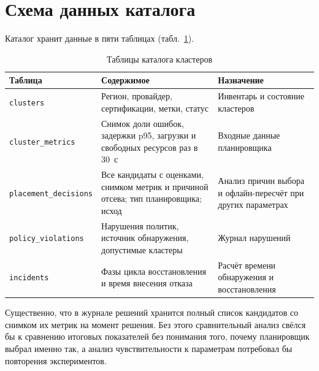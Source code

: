 \section{Схема данных каталога}

Каталог хранит данные в пяти таблицах (табл.~\ref{tab:schema}).

\begin{table}[H]
  \centering
  \caption{Таблицы каталога кластеров}
  \label{tab:schema}
  \small
  \begin{tabularx}{\textwidth}{@{}lXX@{}}
    \toprule
    Таблица & Содержимое & Назначение \\
    \midrule
    \texttt{clusters} & Регион, провайдер, сертификации, метки, статус &
      Инвентарь и состояние кластеров \\
    \texttt{cluster\_metrics} & Снимок доли ошибок, задержки p95, загрузки и
      свободных ресурсов раз в 30~с & Входные данные планировщика \\
    \texttt{placement\_decisions} & Все кандидаты с оценками, снимком метрик
      и причиной отсева; тип планировщика; исход & Анализ причин выбора и
      офлайн-пересчёт при других параметрах \\
    \texttt{policy\_violations} & Нарушения политик, источник обнаружения,
      допустимые кластеры & Журнал нарушений \\
    \texttt{incidents} & Фазы цикла восстановления и время внесения отказа &
      Расчёт времени обнаружения и восстановления \\
    \bottomrule
  \end{tabularx}
\end{table}

Существенно, что в журнале решений хранится полный список кандидатов со
снимком их метрик на момент решения. Без этого сравнительный анализ свёлся бы
к сравнению итоговых показателей без понимания того, почему планировщик
выбрал именно так, а анализ чувствительности к параметрам потребовал бы
повторения экспериментов.
